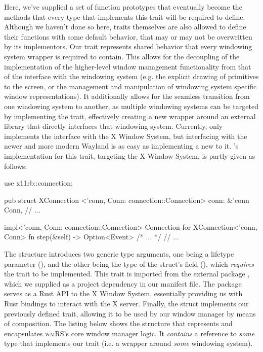 Here, we've supplied a set of function prototypes that eventually become
the methods that every type that implements this trait will be required to
define. Although we haven't done so here, traits themselves are also allowed
to define their functions with some default behavior, that may or may not
be overwritten by its implementors\cite{therustbook, rusttraitsdeepdive}.
Our  trait represents shared behavior that every windowing
system wrapper is required to contain. This allows for the decoupling of the
implementation of the higher-level window management functionality from that of
the interface with the windowing system (e.g. the explicit drawing of primitives
to the screen, or the management and manipulation of windowing system specific
window representations). It additionally allows for the seamless transition from
one windowing system to another, as multiple windowing systems can be targeted
by implementing the trait, effectively creating a new wrapper around an external
library that directly interfaces that windowing system. Currently, \wmrs only
implements the interface with the X Window System, but interfacing with the
newer and more modern Wayland\cite{wayland} is as easy as implementing a new
 to it. \wmrs's implementation for this trait, targeting the X
Window System, is partly given as follows:

\begin{rustblock}
  use x11rb::connection;
\end{rustblock}
\begin{rustblock}
  pub struct XConnection
    <'conn, Conn: connection::Connection>
  {
    conn: &'conn Conn,
    // ...
  }
\end{rustblock}
\begin{rustblock}
  impl<'conn, Conn: connection::Connection>
    Connection for XConnection<'conn, Conn>
  {
    fn step(&self) -> Option<Event> { /* ... */ }
    // ...
  }
\end{rustblock}

The  structure introduces two generic type arguments, one
being a lifetype parameter (), and the other being the type
of the struct's  field (), which \textit{requires}
the  trait to be implemented. This
 trait is imported from the external package
, which we supplied as a project dependency in our manifest file. The
 package serves as a Rust API to the X Window System, essentially
providing us with Rust bindings to interact with the X server. Finally, the
 struct implements our previously defined 
trait, allowing it to be used by our window manager by means of composition.
The listing below shows the structure that represents and encapsulates
\textsc{wmRS}'s core window manager logic. It \textit{contains} a reference to
\textit{some} type that implements our  trait (i.e. a wrapper
around \textit{some} windowing system).

